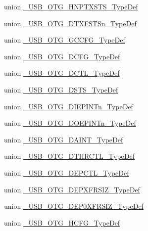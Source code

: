 \begin{DoxyCompactItemize}
\item 
union \hyperlink{union___u_s_b___o_t_g___h_n_p_t_x_s_t_s___type_def}{\-\_\-\-U\-S\-B\-\_\-\-O\-T\-G\-\_\-\-H\-N\-P\-T\-X\-S\-T\-S\-\_\-\-Type\-Def}
\item 
union \hyperlink{union___u_s_b___o_t_g___d_t_x_f_s_t_sn___type_def}{\-\_\-\-U\-S\-B\-\_\-\-O\-T\-G\-\_\-\-D\-T\-X\-F\-S\-T\-Sn\-\_\-\-Type\-Def}
\item 
union \hyperlink{union___u_s_b___o_t_g___g_c_c_f_g___type_def}{\-\_\-\-U\-S\-B\-\_\-\-O\-T\-G\-\_\-\-G\-C\-C\-F\-G\-\_\-\-Type\-Def}
\item 
union \hyperlink{union___u_s_b___o_t_g___d_c_f_g___type_def}{\-\_\-\-U\-S\-B\-\_\-\-O\-T\-G\-\_\-\-D\-C\-F\-G\-\_\-\-Type\-Def}
\item 
union \hyperlink{union___u_s_b___o_t_g___d_c_t_l___type_def}{\-\_\-\-U\-S\-B\-\_\-\-O\-T\-G\-\_\-\-D\-C\-T\-L\-\_\-\-Type\-Def}
\item 
union \hyperlink{union___u_s_b___o_t_g___d_s_t_s___type_def}{\-\_\-\-U\-S\-B\-\_\-\-O\-T\-G\-\_\-\-D\-S\-T\-S\-\_\-\-Type\-Def}
\item 
union \hyperlink{union___u_s_b___o_t_g___d_i_e_p_i_n_tn___type_def}{\-\_\-\-U\-S\-B\-\_\-\-O\-T\-G\-\_\-\-D\-I\-E\-P\-I\-N\-Tn\-\_\-\-Type\-Def}
\item 
union \hyperlink{union___u_s_b___o_t_g___d_o_e_p_i_n_tn___type_def}{\-\_\-\-U\-S\-B\-\_\-\-O\-T\-G\-\_\-\-D\-O\-E\-P\-I\-N\-Tn\-\_\-\-Type\-Def}
\item 
union \hyperlink{union___u_s_b___o_t_g___d_a_i_n_t___type_def}{\-\_\-\-U\-S\-B\-\_\-\-O\-T\-G\-\_\-\-D\-A\-I\-N\-T\-\_\-\-Type\-Def}
\item 
union \hyperlink{union___u_s_b___o_t_g___d_t_h_r_c_t_l___type_def}{\-\_\-\-U\-S\-B\-\_\-\-O\-T\-G\-\_\-\-D\-T\-H\-R\-C\-T\-L\-\_\-\-Type\-Def}
\item 
union \hyperlink{union___u_s_b___o_t_g___d_e_p_c_t_l___type_def}{\-\_\-\-U\-S\-B\-\_\-\-O\-T\-G\-\_\-\-D\-E\-P\-C\-T\-L\-\_\-\-Type\-Def}
\item 
union \hyperlink{union___u_s_b___o_t_g___d_e_p_x_f_r_s_i_z___type_def}{\-\_\-\-U\-S\-B\-\_\-\-O\-T\-G\-\_\-\-D\-E\-P\-X\-F\-R\-S\-I\-Z\-\_\-\-Type\-Def}
\item 
union \hyperlink{union___u_s_b___o_t_g___d_e_p0_x_f_r_s_i_z___type_def}{\-\_\-\-U\-S\-B\-\_\-\-O\-T\-G\-\_\-\-D\-E\-P0\-X\-F\-R\-S\-I\-Z\-\_\-\-Type\-Def}
\item 
union \hyperlink{union___u_s_b___o_t_g___h_c_f_g___type_def}{\-\_\-\-U\-S\-B\-\_\-\-O\-T\-G\-\_\-\-H\-C\-F\-G\-\_\-\-Type\-Def}

\end{DoxyCompactItemize}
